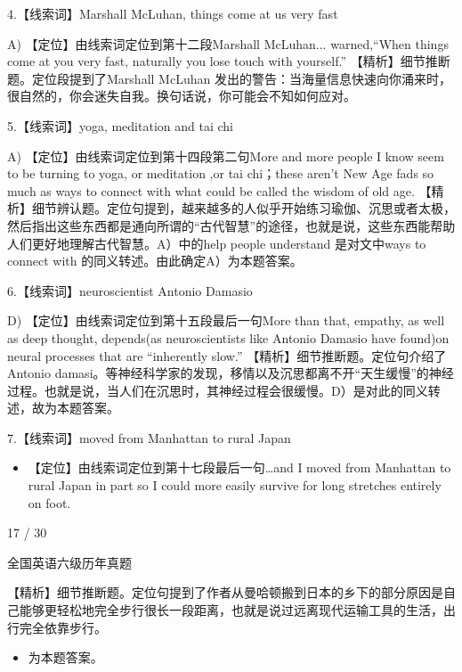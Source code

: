\documentclass[UTF8,11pt]{ctexart}
\begin{document}
4.【线索词】Marshall McLuhan, things come at us very fast


A) 【定位】由线索词定位到第十二段Marshall McLuhan... warned,“When things come at you very fast, naturally you lose touch with yourself.” 【精析】细节推断题。定位段提到了Marshall McLuhan 发出的警告：当海量信息快速向你涌来时，很自然的，你会迷失自我。换句话说，你可能会不知如何应对。


5.【线索词】yoga, meditation and tai chi


A) 【定位】由线索词定位到第十四段第二句More and more people I know seem to be turning to yoga, or meditation ,or tai chi；these aren't New Age fads so much as ways to connect with what could be called the wisdom of old age. 【精析】细节辨认题。定位句提到，越来越多的人似乎开始练习瑜伽、沉思或者太极，然后指出这些东西都是通向所谓的“古代智慧”的途径，也就是说，这些东西能帮助人们更好地理解古代智慧。A）中的help people understand 是对文中ways to connect with 的同义转述。由此确定A）为本题答案。


6.【线索词】neuroscientist Antonio Damasio


D) 【定位】由线索词定位到第十五段最后一句More than that, empathy, as well as deep thought, depends(as neuroscientists like Antonio Damasio have found)on neural processes that are “inherently slow.” 【精析】细节推断题。定位句介绍了Antonio damasi。等神经科学家的发现，移情以及沉思都离不开“天生缓慢”的神经过程。也就是说，当人们在沉思时，其神经过程会很缓慢。D）是对此的同义转述，故为本题答案。


7.【线索词】moved from Manhattan to rural Japan


\begin{itemize}[leftmargin=2em,itemsep=.2em,topsep=.4em]\item[B.] 【定位】由线索词定位到第十七段最后一句…and I moved from Manhattan to rural Japan in part so I could more easily survive for long stretches entirely on foot.
\end{itemize}

17 / 30


全国英语六级历年真题


【精析】细节推断题。定位句提到了作者从曼哈顿搬到日本的乡下的部分原因是自己能够更轻松地完全步行很长一段距离，也就是说过远离现代运输工具的生活，出行完全依靠步行。


\begin{itemize}[leftmargin=2em,itemsep=.2em,topsep=.4em]\item[B.] 为本题答案。
\end{itemize}
\end{document}
